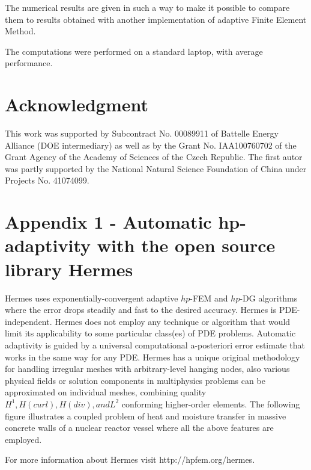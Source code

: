 \documentclass[12pt]{elsarticle}
\begin{document}
The numerical results are given in such a way to make it possible to compare them to results obtained with another implementation of adaptive Finite Element Method.

The computations were performed on a standard laptop, with average performance.

\section{Acknowledgment}

This work was supported by Subcontract No. 00089911 of Battelle
Energy Alliance (DOE intermediary) as well as by the
Grant No. IAA100760702 of the Grant Agency of the Academy
of Sciences of the Czech Republic. The first autor was partly
supported by the National Natural Science Foundation
of China under Projects No. 41074099.

\section{Appendix 1 - Automatic hp-adaptivity with the open source library Hermes}

Hermes uses exponentially-convergent adaptive $hp$-FEM and $hp$-DG algorithms where the error drops steadily and fast to the desired accuracy.
Hermes is PDE-independent. Hermes does not employ any technique or algorithm that would limit its applicability to some particular class(es) of PDE problems. Automatic adaptivity is guided by a universal computational a-posteriori error estimate that works in the same way for any PDE.
Hermes has a unique original methodology for handling irregular meshes with arbitrary-level hanging nodes, also various physical fields or solution components in multiphysics problems can be approximated on individual meshes, combining quality $H^1, H(curl), H(div), and L^2$ conforming higher-order elements. The following figure illustrates a coupled problem of heat and moisture transfer in massive concrete walls of a nuclear reactor vessel where all the above features are employed.

For more information about Hermes visit {http://hpfem.org/hermes}.
\end{document}
